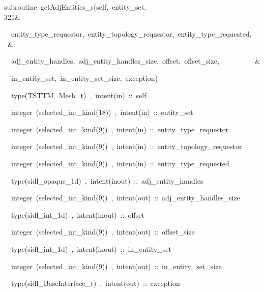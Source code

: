 \begin{lyxcode}
subroutine~getAdjEntities\_s(self,~entity\_set,~~~~~~~~~~~~~~~~~~~~~~~~~~~~~~~~321\&

~~entity\_type\_requestor,~entity\_topology\_requestor,~entity\_type\_requested,~~~\&

~~adj\_entity\_handles,~adj\_entity\_handles\_size,~offset,~offset\_size,~~~~~~~~~~\&

~~in\_entity\_set,~in\_entity\_set\_size,~exception)

~~type(TSTTM\_Mesh\_t)~,~intent(in)~::~self

~~integer~(selected\_int\_kind(18))~,~intent(in)~::~entity\_set

~~integer~(selected\_int\_kind(9))~,~intent(in)~::~entity\_type\_requestor

~~integer~(selected\_int\_kind(9))~,~intent(in)~::~entity\_topology\_requestor

~~integer~(selected\_int\_kind(9))~,~intent(in)~::~entity\_type\_requested

~~type(sidl\_opaque\_1d)~,~intent(inout)~::~adj\_entity\_handles

~~integer~(selected\_int\_kind(9))~,~intent(out)~::~adj\_entity\_handles\_size

~~type(sidl\_int\_1d)~,~intent(inout)~::~offset

~~integer~(selected\_int\_kind(9))~,~intent(out)~::~offset\_size

~~type(sidl\_int\_1d)~,~intent(inout)~::~in\_entity\_set

~~integer~(selected\_int\_kind(9))~,~intent(out)~::~in\_entity\_set\_size

~~type(sidl\_BaseInterface\_t)~,~intent(out)~::~exception
\end{lyxcode}
